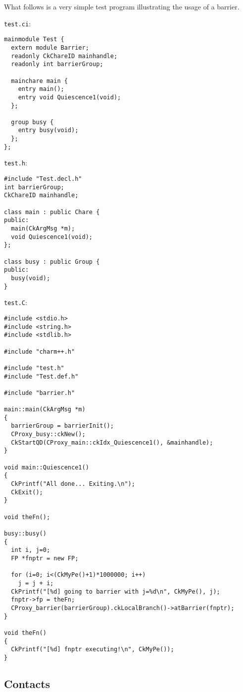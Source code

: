 What follows is a very simple test program illustrating the usage of a
barrier.

{\tt test.ci}:

\begin{verbatim}
mainmodule Test {
  extern module Barrier;
  readonly CkChareID mainhandle;
  readonly int barrierGroup;
  
  mainchare main {
    entry main();
    entry void Quiescence1(void);
  };
  
  group busy {
    entry busy(void);
  };
};
\end{verbatim}

{\tt test.h}:

\begin{verbatim}
#include "Test.decl.h"
int barrierGroup;
CkChareID mainhandle;

class main : public Chare {
public:
  main(CkArgMsg *m);
  void Quiescence1(void);
};

class busy : public Group {
public:
  busy(void);
}
\end{verbatim}

{\tt test.C}:

\begin{verbatim}
#include <stdio.h>
#include <string.h>
#include <stdlib.h>

#include "charm++.h"

#include "test.h"
#include "Test.def.h"

#include "barrier.h"

main::main(CkArgMsg *m)
{
  barrierGroup = barrierInit();
  CProxy_busy::ckNew();
  CkStartQD(CProxy_main::ckIdx_Quiescence1(), &mainhandle);
}

void main::Quiescence1() 
{ 
  CkPrintf("All done... Exiting.\n");
  CkExit();
}

void theFn();

busy::busy()
{
  int i, j=0;
  FP *fnptr = new FP;

  for (i=0; i<(CkMyPe()+1)*1000000; i++)
    j = j + i;
  CkPrintf("[%d] going to barrier with j=%d\n", CkMyPe(), j);
  fnptr->fp = theFn;
  CProxy_barrier(barrierGroup).ckLocalBranch()->atBarrier(fnptr);
}

void theFn()
{
  CkPrintf("[%d] fnptr executing!\n", CkMyPe());
}
\end{verbatim}

\subsection{Contacts}
\label{Distribution}

